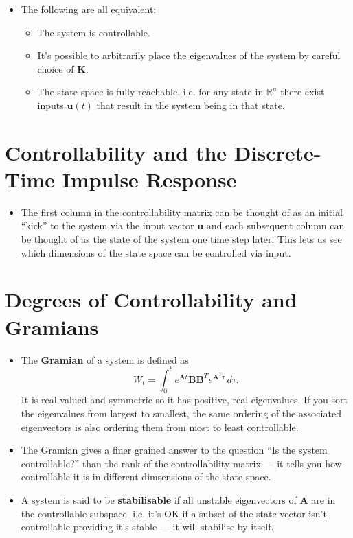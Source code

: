 \documentclass{article}
\renewcommand{\vec}[1]{\boldsymbol{\mathbf{#1}}}
\begin{document}
\begin{itemize}
  \item The following are all equivalent:

        \begin{itemize}
          \item The system is controllable.

          \item It's possible to arbitrarily place the eigenvalues of the system by careful choice of $\vec{K}$.

          \item The state space is fully reachable, i.e. for any state in $\mathbb{R}^n$ there exist inputs $\vec{u}(t)$ that result in the system being in that state.
        \end{itemize}
\end{itemize}

\section{Controllability and the Discrete-Time Impulse Response}

\begin{itemize}
  \item The first column in the controllability matrix can be thought of as an initial ``kick'' to the system via the input vector $\vec{u}$ and each subsequent column can be thought of as the state of the system one time step later. This lets us see which dimensions of the state space can be controlled via input.
\end{itemize}

\section{Degrees of Controllability and Gramians}

\begin{itemize}
  \item The \textbf{Gramian} of a system is defined as \[W_t = \int_0^t e^{\vec{A} t} \vec{B} \vec{B}^T e^{\vec{A}^T \tau} \,d \tau.\] It is real-valued and symmetric so it has positive, real eigenvalues. If you sort the eigenvalues from largest to smallest, the same ordering of the associated eigenvectors is also ordering them from most to least controllable.

  \item The Gramian gives a finer grained answer to the question ``Is the system controllable?'' than the rank of the controllability matrix — it tells you how controllable it is in different dimsensions of the state space.

  \item A system is said to be \textbf{stabilisable} if all unstable eigenvectors of $\vec{A}$ are in the controllable subspace, i.e. it's OK if a subset of the state vector isn't controllable providing it's stable — it will stabilise by itself.
\end{itemize}
\end{document}
